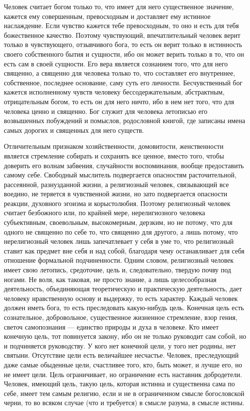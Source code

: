 \documentclass[12pt,oneside]{book}
\begin{document}
Человек считает богом только то, что имеет для него существенное значение, кажется ему совершенным, превосходным и доставляет ему истинное наслаждение. Если чувство кажется тебе превосходным, то оно и есть для тебя божественное качество. Поэтому чувствующий, впечатлительный человек верит только в чувствующего, отзывчивого бога, то есть он верит только в истинность своего собственного бытия и сущности, ибо он может верить только в то, что он есть сам в своей сущности. Его вера является сознанием того, что для него священно, а священно для человека только то, что составляет его внутреннее, собственное, последнее основание, саму суть его личности. Бесчувственный бог кажется исполненному чувств человеку бессодержательным, абстрактным, отрицательным богом, то есть он для него ничто, ибо в нем нет того, что для человека ценно и священно. Бог служит для человека летописью его возвышенных побуждений и помыслов, родословной книгой, где записаны имена самых дорогих и священных для него существ.

Отличительным признаком хозяйственности, домовитости, женственности является стремление собирать и сохранять все ценное, вместо того, чтобы доверить его волнам забвения, случайности воспоминания, вообще предоставить самому себе. Свободный мыслитель подвергается опасностям расточительной, рассеянной, разнузданной жизни, а религиозный человек, связывающий все воедино, не теряется в чувственной жизни, но зато подвергается опасности реакции, духовного эгоизма и корыстолюбия. Поэтому религиозный человек считает безбожного или, по крайней мере, нерелигиозного человека субъективным, своевольным, высокомерным, дерзким, но не потому, что для одного не священно по себе то, что священно для другого, а лишь потому, что нерелигиозный человек лишь запечатлевает у себя в уме то, что религиозный ставит как предмет вне себя и над собой, благодаря чему останавливает для себя отношение формальной подчиненности. Одним словом, религиозный человек имеет свою летопись, средоточие, цель и, следовательно, твердую почву под ногами. Не воля, как таковая, не просто знание, а лишь целесообразная деятельность, объединяющая теоретическую и практическую деятельность, дает человеку нравственную основу и выдержку, то есть характер. Каждый человек должен иметь бога, то есть преследовать какую-нибудь цель. Конечная цель есть сознательное, добровольное, существенное жизненное стремление, взор гения, светоч самопознания --- единство природы и духа в человеке. Кто имеет конечную цель, тот повинуется закону, ибо он не только руководит сам собой, но и подчиняется руководству. У кого нет конечной цели, у того нет родины, нет святыни. Отсутствие цели есть величайшее несчастье. Человек, преследующий даже самые обыденные цели, счастливее того, кто, быть может, и лучше его, но не имеет цели. Цель ограничивает, но ограничение есть наставник добродетели. Человек, имеющий цель, такую цель, которая истинна и существенна сама по себе, имеет тем самым религию, если и не в ограниченном смысле богословской черни, то во всяком случае (что и требуется) в смысле разума, в смысле истины.
\end{document}
